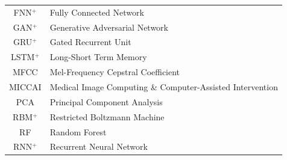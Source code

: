 \documentclass[journal]{IEEEtran}
\begin{document}
\begin{table}[!t]
\begin{minipage}{0.5\textwidth}
\begin{tabularx}{\textwidth}{c l}
			FNN$^+$                                                                                                                                                        & Fully Connected Network                                   \\
			GAN$^+$                                                                                                                                                        & Generative Adversarial Network                            \\
			GRU$^+$                                                                                                                                                        & Gated Recurrent Unit                                      \\
			LSTM$^+$                                                                                                                                                       & Long-Short Term Memory                                    \\
			MFCC                                                                                                                                                           & Mel-Frequency Cepstral Coefficient                        \\
			MICCAI                                                                                                                                                         & Medical Image Computing \& Computer-Assisted Intervention \\
			PCA                                                                                                                                                            & Principal Component Analysis                              \\
			RBM$^+$                                                                                                                                                        & Restricted Boltzmann Machine                              \\
			RF                                                                                                                                                             & Random Forest                                             \\
			RNN$^+$                                                                                                                                                        & Recurrent Neural Network                                  \\

\end{tabularx}
\end{minipage}
\end{table}
\end{document}
